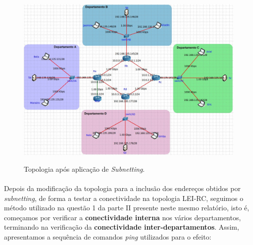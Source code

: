     \paragraph{}
    \begin{figure}[H]
    \centering
    \includegraphics[width=500pt]{images/ParteII/Questao3/TopoSubnetting.jpg}
    \label{parteII-questao3-subnettingNovo}
    \caption{Topologia após aplicação de \textit{Subnetting}.}
    \end{figure}
    
    
    \paragraph{}
    \par Depois da modificação da topologia para a inclusão dos endereços obtidos por \textit{subnetting}, de forma a testar a conectividade na topologia LEI-RC, seguimos o método utilizado na questão 1 da parte II presente neste mesmo relatório, isto é, começamos por verificar a \textbf{conectividade interna} nos vários departamentos, terminando na verificação da \textbf{conectividade inter-departamentos}. Assim, apresentamos a sequência de comandos \textit{ping} utilizados para o efeito:
    
